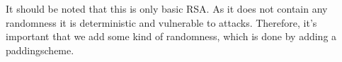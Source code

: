 \documentclass[../master.tex]{subfiles}
\begin{document}

    \vspace{10mm}
    \noindent
    It should be noted that this is only basic RSA. As it does not contain any randomness it is deterministic and vulnerable
    to attacks.
    Therefore, it's important that we add some kind of randomness, which is done by adding a paddingscheme.
\end{document}
